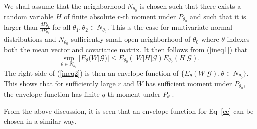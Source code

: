 \documentclass[a4paper,12pt]{article}
\def \G {\mathcal{G}}
\begin{document}
We shall assume that the neighborhood $N_{\theta_0}$ is chosen such that there exists a random variable $H$ of finite absolute $r$-th moment under $P_{\theta_0}$ and  such that it is larger than $\frac{dP_{\theta_1}}{dP_{\theta_2}}$  for all $\theta_1, \theta_2 \in N_{\theta_0}$. This is the case for multivariate normal distributions and $N_{\theta_0}$ sufficiently small open neighborhood of $\theta_0$ where $\theta$ indexes both the mean vector and covariance matrix.  It then follows from  (\ref{ineq1}) that 
\begin{equation}
  \sup_{\theta\in N_{\theta_0}} |E_\theta(W|\G)|\le E_{\theta_0}\left(|W| H|\G\right)E_{\theta_0}\left(H|\G\right).
\label{ineq2}
\end{equation}
The right side of (\ref{ineq2}) is then an envelope function of $\{ E_\theta(W|\G), \theta\in N_{\theta_0}\}$. This shows that for sufficiently large $r$ and $W$ has sufficient moment under $P_{\theta_0}$, the envelope function has finite $q$-th moment under $P_{\theta_0}$.

From the above discussion, it is seen that an envelope function for Eq~\eqref{ce} can be chosen in a similar way.



\end{document}
